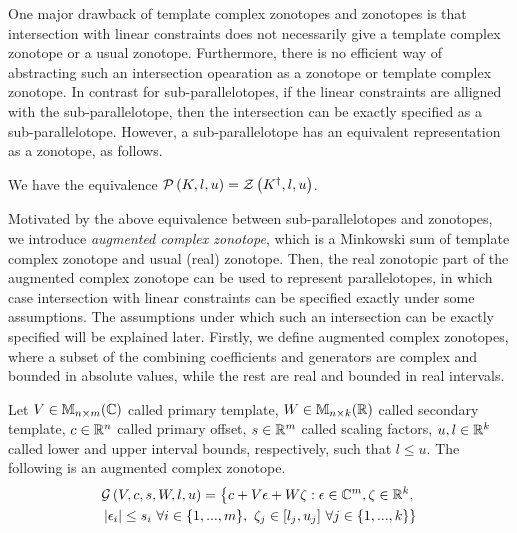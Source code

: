One major drawback of template complex zonotopes and zonotopes is that
intersection with linear constraints does not necessarily give a
template complex zonotope or a usual zonotope.  Furthermore, there is
no efficient way of abstracting such an intersection opearation as a
zonotope or template complex zonotope.  In contrast for
sub-parallelotopes, if the linear constraints are alligned with the
sub-parallelotope, then the intersection can be exactly specified as a
sub-parallelotope.  However, a sub-parallelotope has
an equivalent representation as a zonotope, as follows.
\begin{proposition}
We have the equivalence $\mathcal{P}\left(K,l,u\right)=\mathcal{Z}\left(K^\dagger,l,u\right)$.
\end{proposition}

Motivated by the above equivalence between sub-parallelotopes and
zonotopes, we introduce \emph{augmented complex zonotope}, which is
a Minkowski sum of template complex zonotope and usual (real)
zonotope.  Then, the real zonotopic part of the augmented complex
zonotope can be used to represent parallelotopes, in which case
intersection with linear constraints can be specified exactly under
some assumptions.  The assumptions under which such an intersection
can be exactly specified will be explained later.  Firstly, we define
augmented complex zonotopes, where a subset of the combining
coefficients and generators are complex and bounded in absolute
values, while the rest are real and bounded in real intervals.

\begin{definition}
Let $V\in\mathbb{M}_{n\times m}(\mathbb{C})$ called primary template, $W\in\mathbb{M}_{n\times k}(\mathbb{R})$
called secondary template, $c\in\mathbb{R}^n$ called primary offset,
$s\in\mathbb{R}^m$ called scaling factors, $u,l\in\mathbb{R}^k$ called lower
and upper interval bounds, respectively, such that $l\leq u$.  The
following is an augmented complex
zonotope.
\begin{multline}
\mathcal{G}\left(V,c,s,W,l,u\right) =
\left\{
  c+V\epsilon+W\zeta:\epsilon\in\mathbb{C}^m,\zeta\in\mathbb{R}^k,\right.\\ \left.  \left|\epsilon_i\right|\leq
 s_i~\forall i\in\{1,...,m\},~\zeta_j\in[l_j,u_j]~\forall j\in \{1,...,k\}
\right\}
\end{multline}
\end{definition}
